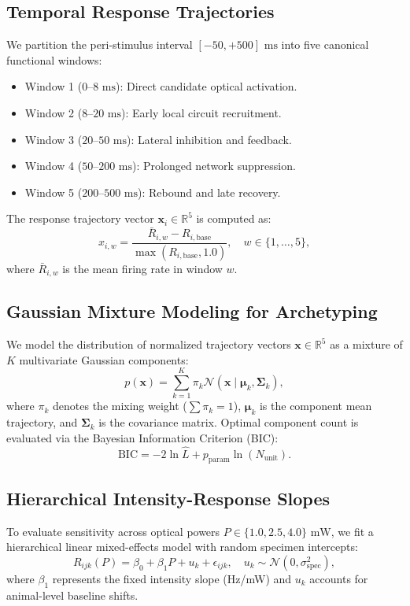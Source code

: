 \documentclass[10pt,journal,compsoc]{IEEEtran}
\begin{document}
\subsection{Temporal Response Trajectories}
We partition the peri-stimulus interval $[-50, +500]\text{ ms}$ into five canonical functional windows:
\begin{itemize}
    \item Window 1 ($0–8\text{ ms}$): Direct candidate optical activation.
    \item Window 2 ($8–20\text{ ms}$): Early local circuit recruitment.
    \item Window 3 ($20–50\text{ ms}$): Lateral inhibition and feedback.
    \item Window 4 ($50–200\text{ ms}$): Prolonged network suppression.
    \item Window 5 ($200–500\text{ ms}$): Rebound and late recovery.
\end{itemize}
The response trajectory vector $\mathbf{x}_i \in \mathbb{R}^5$ is computed as:
\begin{equation}
    x_{i,w} = \frac{\bar{R}_{i,w} - R_{i,\text{base}}}{\max(R_{i,\text{base}}, 1.0)}, \quad w \in \{1, \dots, 5\},
\end{equation}
where $\bar{R}_{i,w}$ is the mean firing rate in window $w$.

\subsection{Gaussian Mixture Modeling for Archetyping}
We model the distribution of normalized trajectory vectors $\mathbf{x} \in \mathbb{R}^5$ as a mixture of $K$ multivariate Gaussian components:
\begin{equation}
    p(\mathbf{x}) = \sum_{k=1}^K \pi_k \mathcal{N}(\mathbf{x} \mid \boldsymbol{\mu}_k, \boldsymbol{\Sigma}_k),
\end{equation}
where $\pi_k$ denotes the mixing weight ($\sum \pi_k = 1$), $\boldsymbol{\mu}_k$ is the component mean trajectory, and $\boldsymbol{\Sigma}_k$ is the covariance matrix. Optimal component count is evaluated via the Bayesian Information Criterion (BIC):
\begin{equation}
    \text{BIC} = -2 \ln \hat{L} + p_{\text{param}} \ln(N_{\text{unit}}).
\end{equation}

\subsection{Hierarchical Intensity-Response Slopes}
To evaluate sensitivity across optical powers $P \in \{1.0, 2.5, 4.0\}\text{ mW}$, we fit a hierarchical linear mixed-effects model with random specimen intercepts:
\begin{equation}
    R_{ijk}(P) = \beta_0 + \beta_1 P + u_k + \epsilon_{ijk}, \quad u_k \sim \mathcal{N}(0, \sigma_{\text{spec}}^2),
\end{equation}
where $\beta_1$ represents the fixed intensity slope (Hz/mW) and $u_k$ accounts for animal-level baseline shifts.
\end{document}
